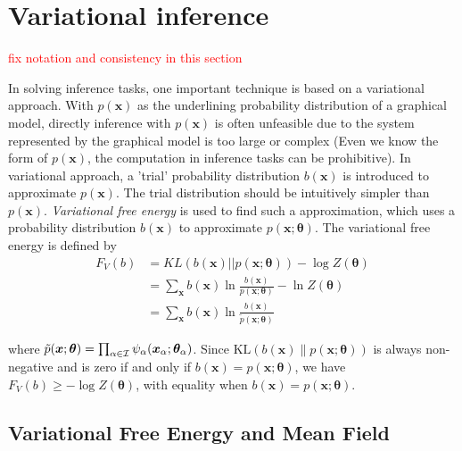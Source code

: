 \section{Variational inference}
\textcolor{red}{fix notation and consistency in this section}

In solving inference tasks, one important technique is based on a variational approach. With $p(\bm{x})$ as the underlining probability distribution of a graphical model, directly inference with $p(\bm{x})$ is often unfeasible due to the system represented by the graphical model is too large or complex (Even we know the form of $p(\bm{x})$, the computation in inference tasks can be prohibitive). In variational approach, a 'trial' probability distribution $b(\bm{x})$ is introduced to approximate $p(\bm{x})$. The trial distribution should be intuitively simpler than $p(\bm{x})$. 
\textit{Variational free energy} \cite{opper2001advanced} is used to find such a approximation, which uses a probability distribution $b(\bm{x})$ to approximate $p(\bm{x};\bm{\theta})$. The variational free energy is defined by
\begin{align}
  F_V(b) & = KL(b( \bm{x}) || p(\bm{x}; \bm{\theta})) - \log{Z(\bm{\theta})} \nonumber \\
         &= \sum_{\bm{x}}b(\bm{x}) \ln{\frac{b(\bm{x})}{{p}(\bm{x}; \bm{\theta})}} - \ln{Z(\bm{\theta})} \nonumber \\
         & = \sum_{\bm{x}}b(\bm{x}) \ln{\frac{b(\bm{x})}{\tilde{p}(\bm{x}; \bm{\theta})}} 
\end{align}

where $\tilde{p}(\bm{x}; \bm{\theta}) =  \prod_{\alpha \in \mathcal{I}} \psi_{\alpha}(\bm{x}_{\alpha}; \bm{\theta}_{\alpha})$. Since $\mathrm{KL}(b(\bm{x})\|p(\bm{x};\bm{\theta}))$ is always non-negative and is zero if and only if $b(\bm{x}) = p(\bm{x};\bm{\theta})$, we have $F_V(b) \geq - \log{Z(\bm{\theta})}$, with equality when $b(\bm{x}) = p(\bm{x};\bm{\theta})$.

\subsection{Variational Free Energy and Mean Field}

